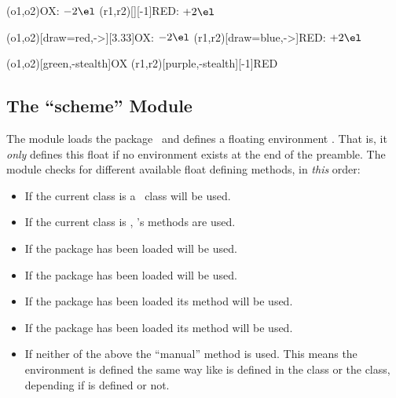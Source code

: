 \documentclass{chemmacros-manual}
\def\chemmodule*#1{\textquotedblleft#1\textquotedblright}%
\begin{document}
\begin{example}
  \vspace{7mm}
  \redox(o1,o2){\small OX: $- 2\el$}
  \redox(r1,r2)[][-1]{\small RED: $+ 2\el$}
  \vspace{7mm}
\end{example}

\begin{example}
  \vspace{14mm}
  \redox(o1,o2)[draw=red,->][3.33]{\small OX: $- 2\el$}
  \redox(r1,r2)[draw=blue,->]{\small RED: $+ 2\el$}
\end{example}

\begin{example}
  \vspace{7mm}
  \redox(o1,o2)[green,-stealth]{\small OX}
  \redox(r1,r2)[purple,-stealth][-1]{\small RED}
  \vspace{7mm}
\end{example}

\subsection{The \chemmodule*{scheme} Module}\label{sec:scheme-module}

The  module loads the 
package~\cite{pkg:chemnum} and defines a floating environment
.  That is, it \emph{only} defines this float if no
environment  exists at the end of the preamble.  The module checks
for different available float defining methods, in \emph{this} order:
\begin{itemize}
  \item If the current class is a \KOMAScript\ class  will
    be used.
  \item If the current class is , 's methods are used.
  \item If the package  has been loaded  will
    be used.
  \item If the package  has been loaded
     will be used.
  \item {}If the package  has been loaded its
    method will be used.
  \item If the package  has been loaded its method will be used.
  \item If neither of the above the \enquote{manual} method is used.  This
    means the environment is defined the same way like  is
    defined in the  class or the  class, depending if
     is defined or not.
\end{itemize}
\end{document}
